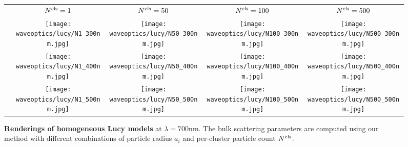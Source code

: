 \begin{figure}[h!]
    \centering
    \setlength{\resLen}{2.55in}
    \setlength{\raiseLen}{1.3in}
    \addtolength{\tabcolsep}{-3.5pt}
    \begin{tabular}{ccccc}
		& $N^\mathrm{cls}=1$ & $N^\mathrm{cls}=50$ & $N^\mathrm{cls}=100$ & $N^\mathrm{cls}=500$
		\\
		\raisebox{\raiseLen}{\rotatebox[origin=c]{90}{$a_i=300\text{nm}$}} &
		\texttt{[image: waveoptics/lucy/N1\_300nm.jpg]} &
		\texttt{[image: waveoptics/lucy/N50\_300nm.jpg]} &
		\texttt{[image: waveoptics/lucy/N100\_300nm.jpg]} &
		\texttt{[image: waveoptics/lucy/N500\_300nm.jpg]}
		\\
		\raisebox{\raiseLen}{\rotatebox[origin=c]{90}{$a_i=400\text{nm}$}} &
		\texttt{[image: waveoptics/lucy/N1\_400nm.jpg]} &
		\texttt{[image: waveoptics/lucy/N50\_400nm.jpg]} &
		\texttt{[image: waveoptics/lucy/N100\_400nm.jpg]} &
		\texttt{[image: waveoptics/lucy/N500\_400nm.jpg]}
		\\
		\raisebox{\raiseLen}{\rotatebox[origin=c]{90}{$a_i=500\text{nm}$}} &
		\texttt{[image: waveoptics/lucy/N1\_500nm.jpg]} &
		\texttt{[image: waveoptics/lucy/N50\_500nm.jpg]} &
		\texttt{[image: waveoptics/lucy/N100\_500nm.jpg]} &
		\texttt{[image: waveoptics/lucy/N500\_500nm.jpg]} \\ [-10pt]
	\end{tabular}
    \caption[Renderings of homogeneous Lucy models]{\label{fig:waveoptics:lucycompare}
        \textbf{Renderings of homogeneous Lucy models} at $\lambda = 700\text{nm}$.
        The bulk scattering parameters are computed using our method with different combinations of particle radius $a_i$ and per-cluster particle count $N^\mathrm{cls}$.
    }
\end{figure}
